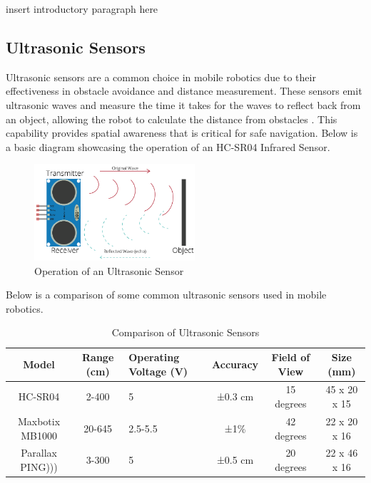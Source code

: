 {insert introductory paragraph here}

\subsection{Ultrasonic Sensors} 
Ultrasonic sensors are a common choice in mobile robotics due to their effectiveness in obstacle avoidance and distance measurement. These sensors emit ultrasonic waves and measure the time it takes for the waves to reflect back from an object, allowing the robot to calculate the distance from obstacles \cite{maupin2023ultrasonic}. This capability provides spatial awareness that is critical for safe navigation. Below is a basic diagram showcasing the operation of an HC-SR04 Infrared Sensor.

\begin{figure}[ht]
    \centering
    \includegraphics[width=0.53\textwidth]{ch2/figs/ultrasonic_sensor.png} %
    \caption{Operation of an Ultrasonic Sensor {\cite{randomnerd2021ultrasonic}}}
    \label{fig:ultrasonic_sensor}
\end{figure}

\noindent
Below is a comparison of some common ultrasonic sensors used in mobile robotics.

\begin{table}[ht]
\centering
\caption{Comparison of Ultrasonic Sensors}
\begin{tabularx}{\textwidth}{|c|c|X|c|c|c|}
\hline
\textbf{Model} & \textbf{Range (cm)} & \textbf{Operating Voltage (V)} & \textbf{Accuracy} & \textbf{Field of View} & \textbf{Size (mm)} \\ \hline
HC-SR04 & 2-400 & 5 & ±0.3 cm & 15 degrees & 45 x 20 x 15 \\ \hline
Maxbotix MB1000 & 20-645 & 2.5-5.5 & ±1\% & 42 degrees & 22 x 20 x 16 \\ \hline
Parallax PING))) & 3-300 & 5 & ±0.5 cm & 20 degrees & 22 x 46 x 16 \\ \hline
\end{tabularx}
\label{tab:ultrasonic_comparison}
\end{table}

